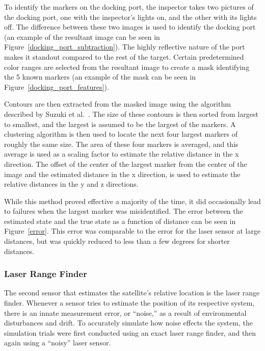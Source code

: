 \documentclass[journal, 10pt]{IEEEtran}
\begin{document}
To identify the markers on the docking port, the inspector takes two pictures of the docking port, one with the inspector's lights on, and the other with its lights off. The difference between these two images is used to identify the docking port (an example of the resultant image can be seen in Figure~\ref{docking_port_subtraction}). The highly reflective nature of the port makes it standout compared to the rest of the target. Certain predetermined color ranges are selected from the resultant image to create a mask identifying the 5 known markers (an example of the mask can be seen in Figure~\ref{docking_port_features}).

Contours are then extracted from the masked image using the algorithm described by Suzuki et al.~\cite{suzuki1985topological}. The size of these contours is then sorted from largest to smallest, and the largest is assumed to be the largest of the markers. A clustering algorithm is then used to locate the next four largest markers of roughly the same size. The area of these four markers is averaged, and this average is used as a scaling factor to estimate the relative distance in the x direction. The offset of the center of the largest marker from the center of the image and the estimated distance in the x direction, is used to estimate the relative distances in the y and z directions.

While this method proved effective a majority of the time, it did occasionally lead to failures when the largest marker was misidentified. The error between the estimated state and the true state as a function of distance can be seen in Figure~\ref{error}. This error was comparable to the error for the laser sensor at large distances, but was quickly reduced to less than a few degrees for shorter distances.

\subsubsection{Laser Range Finder} \label{laser}
The second sensor that estimates the satellite's relative location is the laser range finder. Whenever a sensor tries to estimate the position of its respective system, there is an innate measurement error, or ``noise,'' as a result of environmental disturbances and drift. To accurately simulate how noise effects the system, the simulation trials were first conducted using an exact laser range finder, and then again using a ``noisy'' laser sensor.
\end{document}
